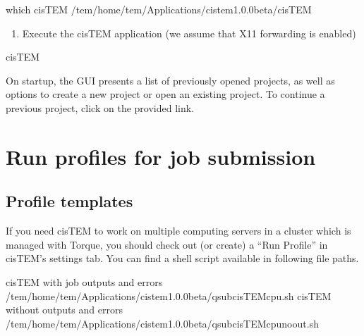 \documentclass[letterpaper,10pt,english]{sphinxmanual}
\begin{document}
\begin{sphinxVerbatim}[commandchars=\\\{\}]
\PYGZdl{}\PYGZgt{} which cisTEM
/tem/home/tem/\PYGZus{}Applications/cistem\PYGZhy{}1.0.0\PYGZhy{}beta/cisTEM
\end{sphinxVerbatim}
\begin{enumerate}
\def\theenumi{\arabic{enumi}}
\def\labelenumi{\theenumi .}
\makeatletter\def\p@enumii{\p@enumi \theenumi .}\makeatother
\setcounter{enumi}{4}
\item {} 
Execute the cisTEM application (we assume that X11 forwarding is enabled)

\end{enumerate}

\begin{sphinxVerbatim}[commandchars=\\\{\}]
\PYGZdl{}\PYGZgt{} cisTEM
\end{sphinxVerbatim}


On startup, the GUI presents a list of previously opened projects, as well as options to create a new project or open an existing project.
To continue a previous project, click on the provided link.


\section{Run profiles for job submission}
\label{\detokenize{cisTEM:run-profiles-for-job-submission}}

\subsection{Profile templates}
\label{\detokenize{cisTEM:profile-templates}}
If you need cisTEM to work on multiple computing servers in a cluster which is managed with Torque, you should check out (or create) a “Run Profile” in cisTEM’s settings tab.
You can find a shell script available in following file paths.

\begin{sphinxVerbatim}[commandchars=\\\{\}]
cisTEM with job outputs and errors /tem/home/tem/\PYGZus{}Applications/cistem\PYGZhy{}1.0.0\PYGZhy{}beta/qsub\PYGZhy{}cisTEM\PYGZhy{}cpu.sh
cisTEM without outputs and errors  /tem/home/tem/\PYGZus{}Applications/cistem\PYGZhy{}1.0.0\PYGZhy{}beta/qsub\PYGZhy{}cisTEM\PYGZhy{}cpu\PYGZhy{}noout.sh
\end{sphinxVerbatim}
\end{document}
